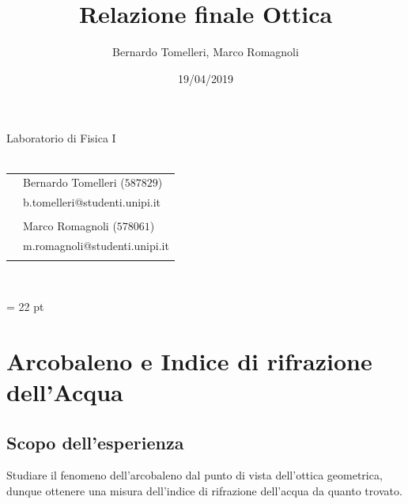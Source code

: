 \documentclass{report}[a4paper,11pt]
\title{Relazione finale Ottica}
\author{Bernardo Tomelleri, Marco Romagnoli}
\date{19/04/2019}
\begin{document}
\begin{titlepage}
	\begin{center}
		{\huge{Laboratorio di Fisica I}}\\\vspace*{7mm}
		{\huge{\textbf{\thetitle}}}\\\vspace*{15mm}
		\begin{tabular}{ll}
		& Bernardo Tomelleri ($587829$) \\
		& b.tomelleri@studenti.unipi.it\\ \\
		& Marco Romagnoli ($578061$) \\
		& m.romagnoli@studenti.unipi.it \\ \\
		\end{tabular}\\\vspace*{5mm}
		{\thedate}
	\end{center}
\end{titlepage}
\makeatother
\restoregeometry
\tableofcontents
\emergencystretch = 22 pt

\chapter{Arcobaleno e Indice di rifrazione dell'Acqua}
\section{Scopo dell'esperienza}
Studiare il fenomeno dell'arcobaleno dal punto di vista dell'ottica geometrica, dunque ottenere una misura dell'indice di rifrazione dell'acqua da quanto trovato.
\end{document}
